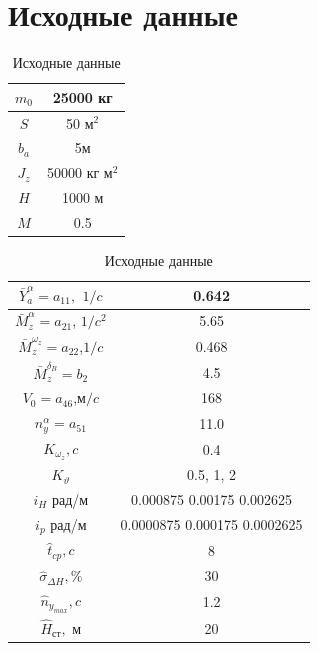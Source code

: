 \documentclass[a4paper,12pt]{article}
\begin{document}
\section{Исходные данные}

    \begin{table}[H]
        \centering
        \caption{Исходные данные}
        \label{tab:Исходные данные 1}
        \begin{tabular}{|c|c|}
        \hline
            $m_0$ & 25000 кг  \\ \hline
            $S$ & 50 м$^2$ \\ \hline
            $b_a$ & 5м  \\ \hline
            $J_z$ & 50000 кг м$^2$ \\ \hline
            $H$ & 1000 м  \\ \hline
            $M$ & 0.5  \\ \hline
        \end{tabular}
    \end{table}
                                
    \begin{table}[H]
        \centering
        \caption{Исходные данные}
        \label{tab:Исходные данные 2}
        \begin{tabular}{|c|c|}
            \hline
            $\bar{Y}_a^\alpha=a_{11},$ $1/c$ &  0.642  \\ \hline
            $\bar{M}_z^{\alpha}=a_{21}$, $1/c^2$ &   5.65 \\ \hline
            $\bar{M}_z^{\omega_z}=a_{22}$,$1/c$ &  0.468 \\ \hline
            $\bar{M}^{\delta_B}_z=b_2$ & 4.5  \\ \hline
            $V_0=a_{46}$,м$/c$ & 168 \\ \hline
            $n_y^\alpha=a_{51}$ &  11.0  \\ \hline
            $K_{\omega_z}, c$ & 0.4 \\ \hline
            $K_\vartheta$  & 0.5, 1, 2  \\ \hline
            $i_H$ рад/м & 0.000875 0.00175 0.002625 \\ \hline
            $i_p$ рад/м & 0.0000875 0.000175 0.0002625 \\ \hline
            $\hat{t}_{cp},c$ & 8 \\ \hline
            $\hat{\sigma}_{\Delta H}, \%$ & 30 \\ \hline
            $\hat{n}_{y_{max}},c$ & 1.2 \\ \hline
            $\hat{H}_{\text{ст}},$ м & 20 \\ \hline
            \end{tabular}
    \end{table}
\end{document}
